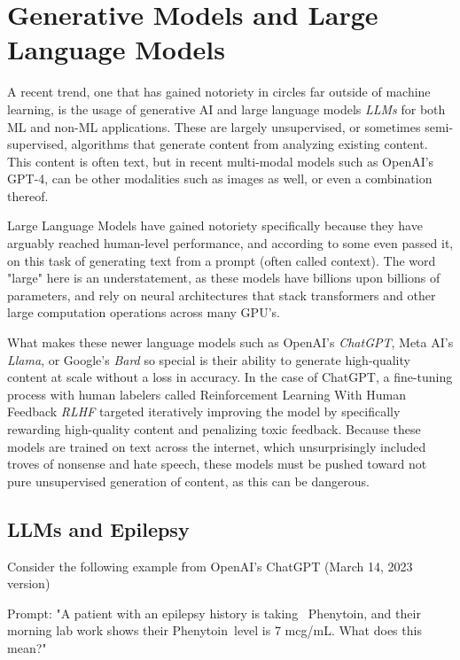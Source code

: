 
\section{Generative Models and Large Language Models}

A recent trend, one that has gained notoriety in circles far outside of machine learning, is the usage of generative AI
and large language models \textit{LLMs} for both ML and non-ML applications. These are largely unsupervised, or sometimes
semi-supervised, algorithms that generate content from analyzing existing content. This content is often text, but in recent
multi-modal models such as OpenAI's GPT-4, can be other modalities such as images as well, or  even a combination thereof.

Large Language Models have gained notoriety specifically because they have arguably reached human-level performance, and according
to some even passed it, on this task of generating text from a prompt (often called context). The word "large" here is an understatement,
as these models have billions upon billions of parameters, and rely on neural architectures that stack transformers and other large
computation operations across many GPU's.

What makes these newer language models such as OpenAI's \textit{ChatGPT}, Meta AI's \textit{Llama}, or Google's \textit{Bard} so special
is their ability to generate high-quality content at scale without a loss in accuracy. In the case of ChatGPT, a fine-tuning process with
human labelers called Reinforcement Learning With Human Feedback \textit{RLHF} targeted iteratively improving the model by specifically
rewarding high-quality content and penalizing toxic feedback. Because these models are trained on text across the internet, which
unsurprisingly included troves of nonsense and hate speech, these models must be pushed toward not pure unsupervised generation of content,
as this can be dangerous.

\subsection{LLMs and Epilepsy}

Consider the following example from OpenAI's ChatGPT (March 14, 2023 version)

\begin{displayquote}
  Prompt: "A patient with an epilepsy history is taking \
  Phenytoin, and their morning lab work shows their Phenytoin\
  level is 7 mcg/mL. What does this mean?"
\end{displayquote}

